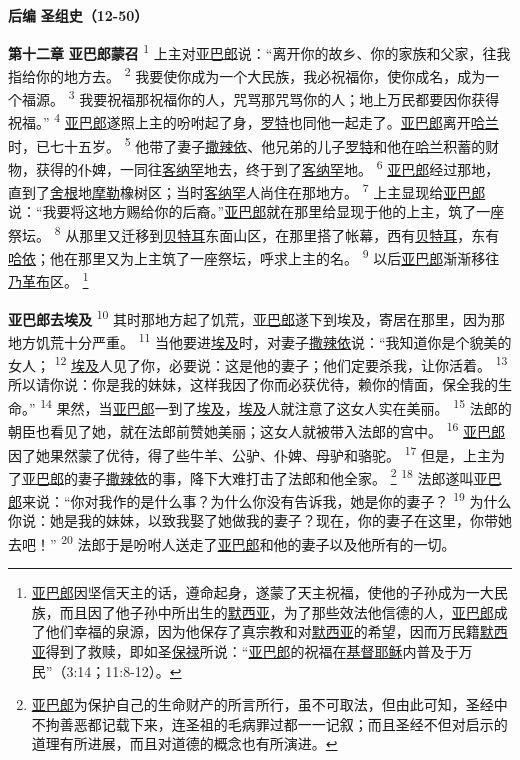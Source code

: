 \begin{center}
	\textbf{后编 }
	\textbf{圣组史（12-50）}
\end{center}

\textbf{第十二章 }
\textbf{亚巴郎蒙召 }
\textsuperscript{1}
上主对\uline{亚巴郎}说：“离开你的故乡、你的家族和父家，往我指给你的地方去。
\textsuperscript{2}
我要使你成为一个大民族，我必祝福你，使你成名，成为一个福源。
\textsuperscript{3}
我要祝福那祝福你的人，咒骂那咒骂你的人；地上万民都要因你获得祝福。”
\textsuperscript{4}
\uline{亚巴郎}遂照上主的吩咐起了身，\uline{罗特}也同他一起走了。\uline{亚巴郎}离开\uline{哈兰}时，已七十五岁。
\textsuperscript{5}
他带了妻子\uline{撒辣依}、他兄弟的儿子\uline{罗特}和他在\uline{哈兰}积蓄的财物，获得的仆婢，一同往\uline{客纳罕}地去，终于到了\uline{客纳罕}地。
\textsuperscript{6}
\uline{亚巴郎}经过那地，直到了\uline{舍根}地\uline{摩勒}橡树区；当时\uline{客纳罕}人尚住在那地方。
\textsuperscript{7}
上主显现给\uline{亚巴郎}说：“我要将这地方赐给你的后裔。”\uline{亚巴郎}就在那里给显现于他的上主，筑了一座祭坛。
\textsuperscript{8}
从那里又迁移到\uline{贝特耳}东面山区，在那里搭了帐幕，西有\uline{贝特耳}，东有\uline{哈依}；他在那里又为上主筑了一座祭坛，呼求上主的名。
\textsuperscript{9}
以后\uline{亚巴郎}渐渐移往\uline{乃革布}区。
\footnote{\uline{亚巴郎}因坚信天主的话，遵命起身，遂蒙了天主祝福，使他的子孙成为一大民族，而且因了他子孙中所出生的\uline{默西亚}，为了那些效法他信德的人，\uline{亚巴郎}成了他们幸福的泉源，因为他保存了真宗教和对\uline{默西亚}的希望，因而万民籍\uline{默西亚}得到了救赎，即如圣\uline{保禄}所说：“\uline{亚巴郎}的祝福在\uline{基督}\uline{耶稣}内普及于万民”（3:14；11:8-12）。}

\textbf{亚巴郎去埃及 }
\textsuperscript{10}
其时那地方起了饥荒，\uline{亚巴郎}遂下到埃及，寄居在那里，因为那地方饥荒十分严重。
\textsuperscript{11}
当他要进\uline{埃及}时，对妻子\uline{撒辣依}说：“我知道你是个貌美的女人；
\textsuperscript{12}
\uline{埃及}人见了你，必要说：这是他的妻子；他们定要杀我，让你活着。
\textsuperscript{13}
所以请你说：你是我的妹妹，这样我因了你而必获优待，赖你的情面，保全我的生命。”
\textsuperscript{14}
果然，当\uline{亚巴郎}一到了\uline{埃及}，\uline{埃及}人就注意了这女人实在美丽。
\textsuperscript{15}
法郎的朝臣也看见了她，就在法郎前赞她美丽；这女人就被带入法郎的宫中。
\textsuperscript{16}
\uline{亚巴郎}因了她果然蒙了优待，得了些牛羊、公驴、仆婢、母驴和骆驼。
\textsuperscript{17}
但是，上主为了\uline{亚巴郎}的妻子\uline{撒辣依}的事，降下大难打击了法郎和他全家。
\footnote{\uline{亚巴郎}为保护自己的生命财产的所言所行，虽不可取法，但由此可知，圣经中不拘善恶都记载下来，连圣祖的毛病罪过都一一记叙；而且圣经不但对启示的道理有所进展，而且对道德的概念也有所演进。}
\textsuperscript{18}
法郎遂叫\uline{亚巴郎}来说：“你对我作的是什么事？为什么你没有告诉我，她是你的妻子？
\textsuperscript{19}
为什么你说：她是我的妹妹，以致我娶了她做我的妻子？现在，你的妻子在这里，你带她去吧！”
\textsuperscript{20}
法郎于是吩咐人送走了\uline{亚巴郎}和他的妻子以及他所有的一切。


